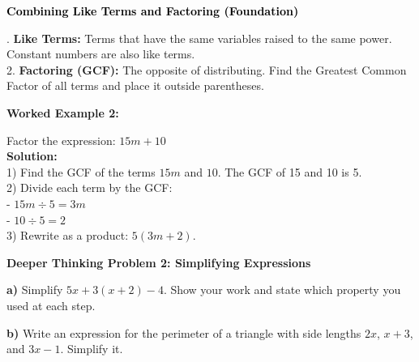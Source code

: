 \documentclass[12pt, letterpaper, fleqn]{article}
\begin{document}
\begin{tcolorbox}[colback=black!10]
    \large\textcolor{black}{\textbf{Combining Like Terms and Factoring (Foundation)}}
\end{tcolorbox}

\vspace{3mm}

. \textbf{Like Terms:} Terms that have the same variables raised to the same power. Constant numbers are also like terms. \\
2. \textbf{Factoring (GCF):} The opposite of distributing. Find the Greatest Common Factor of all terms and place it outside parentheses.

\vspace{4mm}

\begin{tcolorbox}[colback=white, colframe=black!25, boxrule=0.6pt, arc=4mm, left=6mm, right=6mm, top=5mm, bottom=5mm]
\textbf{Worked Example 2:}

\medskip
\noindent
Factor the expression: $15m + 10$\\
\textbf{Solution:} \\
1) Find the GCF of the terms $15m$ and $10$. The GCF of 15 and 10 is 5. \\
2) Divide each term by the GCF: \\
- $15m \div 5 = 3m$ \\
- $10 \div 5 = 2$ \\
3) Rewrite as a product: $5(3m + 2)$.
\end{tcolorbox}

\vspace{4mm}

\begin{tcolorbox}[colback=white, colframe=black, boxrule=1pt, arc=4mm, left=6mm, right=6mm, top=5mm, bottom=5mm]
\textbf{Deeper Thinking Problem 2: Simplifying Expressions}

\medskip

\noindent
\textbf{a)} Simplify $5x + 3(x + 2) - 4$. Show your work and state which property you used at each step.

\vspace{2.5cm}

\noindent
\textbf{b)} Write an expression for the perimeter of a triangle with side lengths $2x$, $x+3$, and $3x-1$. Simplify it.

\vspace{3cm}
\end{tcolorbox}
\newpage
\end{document}

